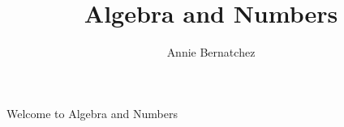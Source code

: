 \documentclass{article}
\title{Algebra and Numbers}
\author{Annie Bernatchez}
\begin{document}
  \maketitle
  \newpage

  Welcome to Algebra and Numbers
\end{document}
